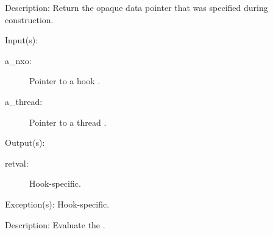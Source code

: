 \begin{capi}
\begin{capilist}
	\item[Description: ]
		Return the opaque data pointer that was specified during
		construction.
	\end{capilist}
\label{nxo_hook_eval}
	\begin{capilist}
	\item[Input(s): ]
		\begin{description}\item[]
		\item[a\_nxo: ]
			Pointer to a hook .
		\item[a\_thread: ]
			Pointer to a thread .
		\end{description}
	\item[Output(s): ]
		\begin{description}\item[]
		\item[retval: ]
			Hook-specific.
		\end{description}
	\item[Exception(s): ] Hook-specific.
	\item[Description: ]
		Evaluate the .
	\end{capilist}
\end{capi}
